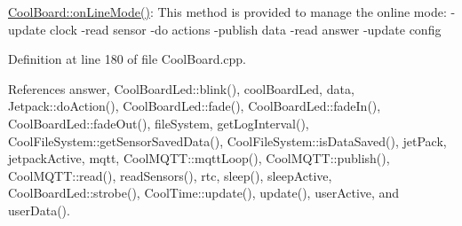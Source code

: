 \hyperlink{classCoolBoard_aa0bbc4bc605e35618d18e68795c61363}{Cool\+Board\+::on\+Line\+Mode()}\+: This method is provided to manage the online mode\+: -\/update clock -\/read sensor -\/do actions -\/publish data -\/read answer -\/update config 

Definition at line 180 of file Cool\+Board.\+cpp.



References answer, Cool\+Board\+Led\+::blink(), cool\+Board\+Led, data, Jetpack\+::do\+Action(), Cool\+Board\+Led\+::fade(), Cool\+Board\+Led\+::fade\+In(), Cool\+Board\+Led\+::fade\+Out(), file\+System, get\+Log\+Interval(), Cool\+File\+System\+::get\+Sensor\+Saved\+Data(), Cool\+File\+System\+::is\+Data\+Saved(), jet\+Pack, jetpack\+Active, mqtt, Cool\+M\+Q\+T\+T\+::mqtt\+Loop(), Cool\+M\+Q\+T\+T\+::publish(), Cool\+M\+Q\+T\+T\+::read(), read\+Sensors(), rtc, sleep(), sleep\+Active, Cool\+Board\+Led\+::strobe(), Cool\+Time\+::update(), update(), user\+Active, and user\+Data().



